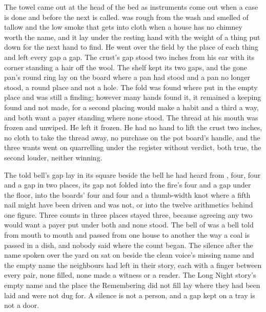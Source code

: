 \scenebreak

The towel came out at the head of the bed as instruments come out when a case is done and before the next is called.  was rough from the wash and smelled of tallow and the low smoke that gets into cloth when a house has no chimney worth the name, and it lay under the resting hand with the weight of a thing put down for the next hand to find. He went over the field by the place of each thing and left every gap a gap. The crust's gap stood two inches from his ear with its corner standing a hair off the wool. The shelf kept its two gaps, and the gone pan's round ring lay on the board where a pan had stood and a pan no longer stood, a round place and not a hole. The fold was found where put in the empty place and was still a finding; however many hands found it, it remained a keeping found and not made, for a second placing would make a habit and a third a way, and both want a payer standing where none stood. The thread at his mouth was frozen and unwiped. He left it frozen. He had no hand to lift the crust two inches, no cloth to take the thread away, no purchase on the pot board's handle, and the three wants went on quarrelling under the register without verdict, both true, the second louder, neither winning.

The told bell's gap lay in its square beside the bell he had heard from , four, four and a gap in two places, its gap not folded into the fire's four and a gap under the floor, into the boards' four and four and a thumb-width knot where a fifth nail might have been driven and was not, or into the twelve arithmetics behind one figure. Three counts in three places stayed three, because agreeing any two would want a payer put under both and none stood. The bell of  was a bell told from mouth to mouth and passed from one house to another the way a coal is passed in a dish, and nobody said where the count began. The silence after the name spoken over the yard on  sat on  beside the clean voice's missing name and the empty name the neighbours had left in their story, each with a finger between every pair, none filled, none made a witness or a reader. The Long Night story's empty name and the place the Remembering did not fill lay where they had been laid and were not dug for. A silence is not a person, and a gap kept on a tray is not a door.

